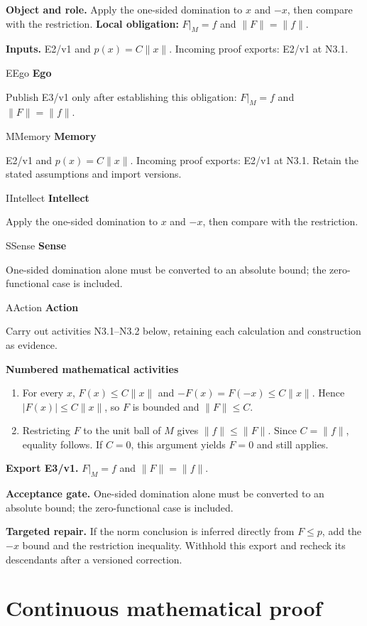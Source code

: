 \documentclass[preprint,12pt,aps,pra,showkeys,amsmath,amssymb,superscriptaddress,floatfix]{revtex4-2}
\theoremstyle{definition}
\theoremstyle{remark}
\newcommand{\mmfaculty}[3]{%
 \begin{mmfacultybox}{#1}{#2}
 {\sffamily\bfseries\color{MMBlue}#2}\par\smallskip #3
 \end{mmfacultybox}}
\newcommand{\field}[2]{\par\smallskip\noindent\textbf{#1.} #2\par}
\begin{document}
\field{Object and role}{Apply the one-sided domination to \(x\) and \(-x\), then compare with
the restriction. \textbf{Local obligation:} \(F|_M=f\) and
\(\|F\|=\|f\|\).}

\field{Inputs}{E2/v1 and \(p(x)=C\|x\|\). Incoming proof exports: E2/v1 at N3.1.}

\mmfaculty{E}{Ego}{Publish E3/v1 only after establishing this obligation: \(F|_M=f\) and
\(\|F\|=\|f\|\).}

\mmfaculty{M}{Memory}{E2/v1 and \(p(x)=C\|x\|\). Incoming proof exports: E2/v1 at N3.1. Retain
the stated assumptions and import versions.}

\mmfaculty{I}{Intellect}{Apply the one-sided domination to \(x\) and \(-x\), then compare with
the restriction.}

\mmfaculty{S}{Sense}{One-sided domination alone must be converted to an absolute bound; the
zero-functional case is included.}

\mmfaculty{A}{Action}{Carry out activities N3.1--N3.2 below, retaining each calculation and
construction as evidence.}

\smallskip\noindent\textbf{Numbered mathematical activities}

\begin{enumerate}[label=N3.\arabic*,leftmargin=3.4em]

\item For every \(x\), \(F(x)\le C\|x\|\) and \(-F(x)=F(-x)\le C\|x\|\). Hence
\(|F(x)|\le C\|x\|\), so \(F\) is bounded and \(\|F\|\le C\).

\item Restricting \(F\) to the unit ball of \(M\) gives \(\|f\|\le\|F\|\).
Since \(C=\|f\|\), equality follows. If \(C=0\), this argument yields
\(F=0\) and still applies.

\end{enumerate}

\field{Export E3/v1}{\(F|_M=f\) and \(\|F\|=\|f\|\).}

\field{Acceptance gate}{One-sided domination alone must be converted to an absolute bound; the
zero-functional case is included.}

\field{Targeted repair}{If the norm conclusion is inferred directly from \(F\le p\), add the
\(-x\) bound and the restriction inequality. Withhold this export and
recheck its descendants after a versioned correction.}

\endgroup\clearpage\section{Continuous mathematical proof}\label{sec:proof}
\end{document}
